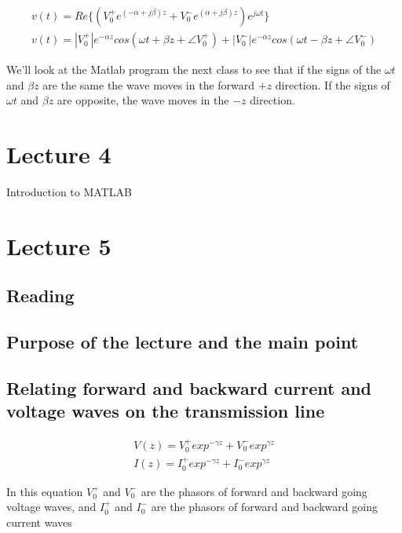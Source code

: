 \begin{eqnarray}
v(t)=Re\{ (V_0^+ e^{(-\alpha + j \beta) z} + V_0^- e^{(\alpha + j
 \beta) z})e^{j \omega t} \} \nonumber \\ \nonumber
v(t)=|V_0^+|e^{-\alpha z} cos(\omega t + \beta z + \angle V_0^+)+
|V_0^-|e^{-\alpha z} cos(\omega t - \beta z + \angle V_0^-)
\end{eqnarray}

We'll look at the Matlab program the next class to see that if the signs of the $\omega t$ and
$\beta z$ are the same the wave moves in the forward $+z$
direction. If the signs of $\omega t$ and $\beta z$ are opposite, the
wave moves in the $-z$ direction.

\newpage

\section{Lecture 4}

Introduction to MATLAB

\newpage

\section{Lecture 5}

\subsection{Reading}


\subsection{Purpose of the lecture and the main point}

\subsection{Relating forward and backward current and voltage waves on
the transmission line}


\begin{eqnarray}
V(z)=V_0^+ exp^{-\gamma z} + V_0^- exp^{\gamma z}\label{eq4} \\
I(z)=I_0^+ exp^{-\gamma z} + I_0^- exp^{\gamma z}\label{eq5}
\end{eqnarray}

In this equation $V_0^+$ and $V_0^-$ are the phasors of forward and
backward going voltage waves, and $I_0^+$ and $I_0^-$ are the phasors of forward and
backward going current waves

